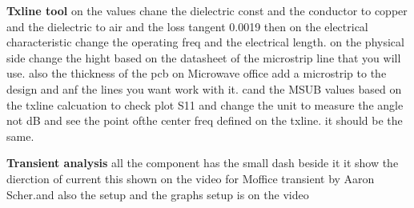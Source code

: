 \documentclass{article}
\begin{document}
\begin{itemize}
\begin{itemize}
\end{itemize}


\textbf{Txline tool}
on the  values chane the dielectric const and the conductor to copper and the dielectric to air and the loss tangent 0.0019 
then on the electrical characteristic change the operating freq and the electrical length. 
on the physical side change the hight based on the datasheet of the microstrip line that you will use. 
also the thickness of the pcb 
on Microwave office add a microstrip to the design and anf the lines you want work with it. 
cand the MSUB values based on the txline calcuation 
to check plot S11 and change the unit to measure the angle not dB and see the point ofthe center freq defined on the txline. 
it should be the same. 



\textbf{Transient analysis}
all the component has the small dash beside it it show the dierction of current this shown on the video for Moffice transient by Aaron Scher.and also the setup and the graphs setup is on the video




























\end{itemize}
\end{document}
